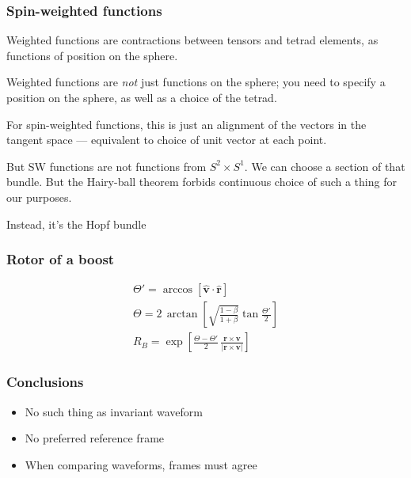 \documentclass[12pt,xcolor={dvipsnames}]{beamer}
\renewcommand{\vec}{\bm}
\renewcommand{\vec}[1]{\boldsymbol{#1}}
\begin{document}


\begin{frame}
  \frametitle{Spin-weighted functions}
  Weighted functions are contractions between tensors and tetrad
  elements, as functions of position on the sphere.

  Weighted functions are \emph{not} just functions on the sphere; you
  need to specify a position on the sphere, as well as a choice of the
  tetrad.

  For spin-weighted functions, this is just an alignment of the
  vectors in the tangent space --- equivalent to choice of unit vector
  at each point.

  But SW functions are not functions from $S^{2} \times S^{1}$.  We
  can choose a section of that bundle.  But the Hairy-ball theorem
  forbids continuous choice of such a thing for our purposes.

  Instead, it's the Hopf bundle
\end{frame}

\begin{frame}
  \frametitle{Rotor of a boost}
  \begin{gather*}
    \Theta' = \arccos \left[ \hat{\vec{v}} \cdot \hat{\vec{r}} \right]
    \\[15pt]
    \Theta = 2\, \arctan \left[ \sqrt{ \frac{1-\beta} {1+\beta} } \tan
      \frac{\Theta'}{2} \right]
    \\[15pt]
    R_{B} = \exp \left[ \frac{\Theta - \Theta'} {2}\, \frac{\vec{r}
        \times \vec{v}} {\lvert \vec{r} \times \vec{v} \rvert} \right]
  \end{gather*}
\end{frame}

\begin{frame}
  \frametitle{Conclusions}
  \begin{itemize}
  \item No such thing as invariant waveform
  \item No preferred reference frame
  \item When comparing waveforms, frames must agree
  \end{itemize}
\end{frame}
\end{document}
